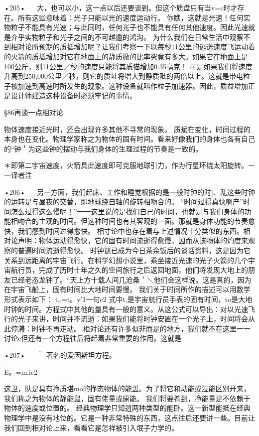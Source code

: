 •205•
  
大，也可以小，这一点以后还要谈到。但这个质盘只有当v=c时才存在。所有这些意味着：光子只能以光的速度运动行。
你瞧，这就是光速！任何实物粒子不能具有光速；与此同时，任何光子也不能具有任何其他速度。因此光速就是介乎实物粒子和光子之间的不可越逾的鸿沟。
为什么我们在日常生活中观察不到相对论所预期的质抵增加呢？让我们考察一下以每秒11公里的逃逸速度飞运动着的火箭的质坻增加对它在地面上的静质掀的比率究竟有多大。如果它在地面上是100公斤，则11公里／秒的速度只能将其质猫增加0.35亳克！
可是如果我们将速度升高到250,000公里／秒，则它的质址将增大到静质阰的两倍以上。这就是带电粒子被加速到高速时所发生的现象。这种设备就叫作粒子加速器。因此，质益增加正是设计师建造这种设备时必须牢记的事情。

§86再谈一点相对论

物体速度接近光时，还会出现许多其他不寻常的现象。
质斌在变化，时间过程的本身也在变化。物理学家称之为物体的固有时间。看来好像我们的身体也各有自己的“钟＇为这些钟的摆动与我们身体的生理过程的节奏是一致的。

＊即第二宇宙速度，火箭具此速度即可克服地球引力，作为行星环绕太阳旋转。一一译者注

•206•
  
另一方面，我们起床、工作和睡觉根据的是一般时钟的时|、乱这些时钟的运转是与昼夜的交替，即地球绕自轴的旋转相吻合的。
“时间过得真快啊产”时间怎么过得这么慢呢！”一一这里说的是找们自己的时间，也就是与我们身体的功能相吻合的主观的时间。但这种时间也有其客观的一面。那就是身体功能的节奏愈快，我们感到时间过得愈快。
相寸论中也存在着与上述情况十分类似的东西。相对论声明：物体运动得愈快，它的固有时间流逝得愈慢，因而从该物体的灼度来观察的普遍时间流逝得愈快。
时钟谜已成为今日茶余饭后的谈话资料，这是因为它关系到远距离的宇宙飞行。在科学幻想小说里，乘坐接近光速的光子火箭的几个宇宙航行员，完成了历时十年之久的空间旅行之后返回地面，他们将发现大地上的朋友已经老态龙钟了。“天上方十载人间几沧桑＇＼他们会这样说。这是真的，因为在宇宙飞船上，固有时间比大地时间要慢。
我们关于时间所作的描述可以用数学形式表示如下：
t,.=t。v'1一句c2
式中t,是宇宙航行员手表的固有时间，to是大地时钟的时间。方程式中其他的量具有一般的意义。从这公式可以导出：对以光速飞行的光子来讲，时间并不流逝：如果我们能将时钟安置在一个光子上，时间将会从此停滞：时钟不再走动。
柜对论还有许多似非而是的地方，我们就不在这里一一讨论c但还有一个方程往后将起着非常重要的作用。这就是

•207•
  
｀
著名的爱因斯坦方程。

E。=m.ic2

这卫，队是具有挣质堪mo的挣态物体的能盄。为了将它和动能或泣能区别开来，我们称之为物体的静能鼠，固有佬量或原能。
我们将要肴到，挣能量是不依赖于物体的速度或位置的。
经典物理学只知逍两种类型的能卧。这一新型能抵在经典物理学中是没有地位的。它是一种非常特殊的东西，这点往后还要讲一些。目前让我们回到相对论上来，看看它是怎祥被引入氓子力学的。

